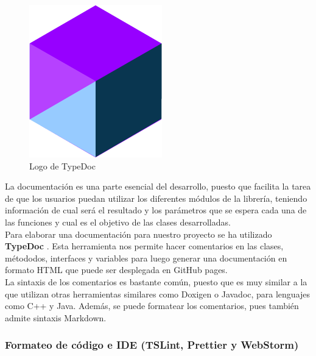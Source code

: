 \begin{figure}[ht]
    \centering
    \includegraphics[scale=0.3]{mem/images/cap-4/4.1.2(desarrollo)/typedoc-logo.png}
    \caption{Logo de TypeDoc}
    \label{fig:typedoc}
\end{figure}
 
 La documentación es una parte esencial del desarrollo, puesto que facilita la tarea de que los usuarios puedan utilizar los diferentes módulos de la librería, teniendo información de cual será el resultado y los parámetros que se espera cada una de las funciones y cual es el objetivo de las clases desarrolladas. \\
 
 Para elaborar una documentación para nuestro proyecto se ha utilizado \textbf{TypeDoc} \cite{typedoc}. Esta herramienta nos permite hacer comentarios en las clases, métododos, interfaces y variables para luego generar una documentación en formato HTML que puede ser desplegada en GitHub pages. \\
 
 La sintaxis de los comentarios es bastante común, puesto que es muy similar a la que utilizan otras herramientas similares como Doxigen o Javadoc, para lenguajes como C++ y Java. Además, se puede formatear los comentarios, pues también admite sintaxis Markdown.
 
 \subsubsection{Formateo de código e IDE (TSLint, Prettier y WebStorm)}
 
